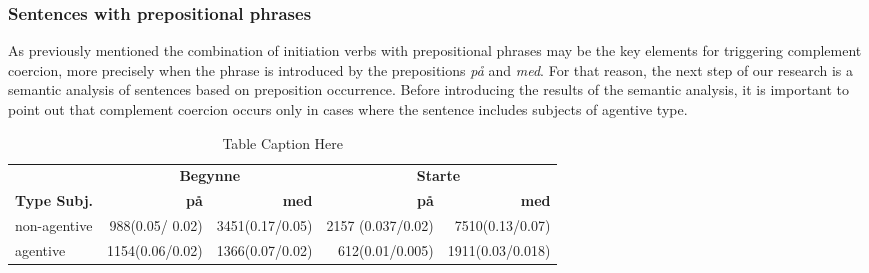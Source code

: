 \documentclass{article}
\begin{document}
\subsubsection{Sentences with prepositional phrases}
As previously mentioned the combination of initiation verbs with prepositional phrases may be the key elements for triggering complement coercion, more precisely when the phrase is introduced by the prepositions \emph{på} and \emph{med}. %
For that reason, the next step of our research is a semantic analysis of sentences based on preposition occurrence. 
Before introducing the results of the semantic analysis, it is important to point out that complement coercion occurs only in cases where the sentence includes subjects of agentive type.
\begin{table}[!]
    \centering
    \begin{tabular}{lrrrr}
        \toprule
        & \multicolumn{2}{c}{\textbf{Begynne}} & \multicolumn{2}{c}{\textbf{Starte}} \\
        \cmidrule(lr){2-3} \cmidrule(lr){4-5}
        \textbf{Type Subj.} & \textbf{på} & \textbf{med} & \textbf{på} & \textbf{med} \\
        \midrule
        non-agentive &   988(0.05/ 0.02) & 3451(0.17/0.05) & 2157	(0.037/0.02) & 7510(0.13/0.07)\\
        agentive      &  1154(0.06/0.02) & 1366(0.07/0.02)  & 612(0.01/0.005) &  1911(0.03/0.018) \\
        \bottomrule
    \end{tabular}
    \caption{Table Caption Here}
    \label{tab:initiation_verbs_agentive_no_agentive}
\end{table}
\end{document}
